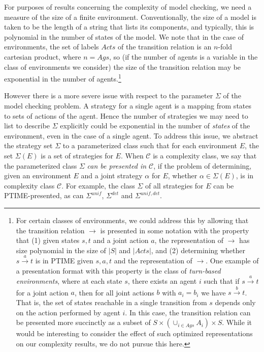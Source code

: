\documentclass[a4wide]{article}
\newcommand{\trans}{\rightarrow}
\newcommand{\ptrans}[1]{\stackrel{#1}{\longrightarrow}}
\theoremstyle{examplesty}
\newcommand{\Ags}{\mathit{Ags}}
\newcommand{\Env}{E}
\newcommand{\Acts}{\mathit{Acts}}
\newcommand{\detstrat}{\mathit{det}}
\newcommand{\unif}{\mathit{unif}}
\newcommand{\Strat}{\Sigma}
\newcommand{\Strats}{\Sigma}
\begin{document}
For purposes of results concerning the complexity of model checking, we need a measure
of the size of a finite environment. Conventionally, the size of a model is taken to be the 
length of a string that lists its components, and typically, this is polynomial in the 
number of states of the model. 
We note that in the 
case of environments, the set of labels $\Acts$ of the transition relation 
is an $n$-fold cartesian product, where $n = \Ags$, so 
(if the number of agents is a variable in the class of environments we consider) the size of the transition relation 
may be exponential in the number of 
agents.\footnote{
For certain classes of environments, we could address this 
by allowing  that the transition relation $\trans$ is presented in some notation with the property
that (1) given states $s,t$ and a joint action $a$, 
the representation of $\ptrans{}$ has size polynomial in the size of $|S|$ and $|\Acts|$, 
and (2) 
determining whether $s\ptrans{a} t$ is 
in PTIME
given $s,a,t$ and the representation of $\ptrans{}$. 
One example of a presentation format with this property is the 
class of {\em turn-based environments}, where at each state $s$, there exists an 
agent $i$ such that if $s\ptrans{a} t$ for a joint action $a$, then for all joint actions $b$
with $a_i = b_i$ we have $s\ptrans{b} t$. That is,  the set of states reachable
in a single transition from $s$ depends only on the action performed by agent $i$. 
In this case, the transition relation can be presented more succinctly 
as a subset of $S\times (\cup_{i\in \Ags} A_i)\times S$. 
While it would be interesting to consider the effect of such optimized representations on 
our complexity results, we do not pursue this here.}


However there is a more severe issue with respect to the parameter $\Strat$ 
of the model checking problem. A strategy for a single agent is a mapping from 
states to sets of actions of the agent. Hence the number of strategies we may need to 
list to describe $\Strat$  explicitly could be exponential in the 
number of \emph{states} of the environment, even in the case of a single agent. 
To address this issue, we abstract 
the strategy set 
 $\Strats$ to a parameterized 
class such that for each environment $\Env$, the set $\Strats(\Env)$ is a set of strategies for $\Env$. 
When $\mathcal{ C}$ is a complexity class, 
we say that the parameterized class $\Strats$  {\em can be presented in $\mathcal{ C}$}, 
 if the problem of determining,  
given an 
environment  $\Env$ and a joint strategy $\alpha$ for  $\Env$, whether  $\alpha \in \Strats(\Env)$,  is in complexity class $\mathcal{ C}$. 
For example, the class 
$\Strats$ of all strategies for  $\Env$ can be PTIME-presented, as can $\Strats^\unif$,  $\Strats^{\detstrat}$ and  $\Strats^{\unif,\detstrat}$. 
\end{document}
